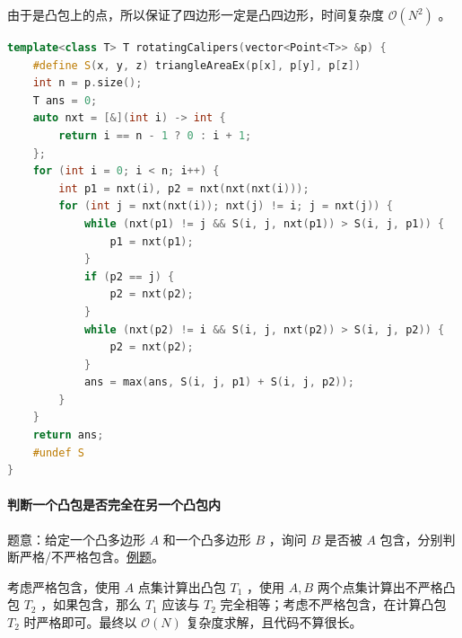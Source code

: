 由于是凸包上的点，所以保证了四边形一定是凸四边形，时间复杂度 \(\mathcal O(N^2)\) 。

\begin{lstlisting}[language={C++}]
template<class T> T rotatingCalipers(vector<Point<T>> &p) {
    #define S(x, y, z) triangleAreaEx(p[x], p[y], p[z])
    int n = p.size();
    T ans = 0;
    auto nxt = [&](int i) -> int {
        return i == n - 1 ? 0 : i + 1;
    };
    for (int i = 0; i < n; i++) {
        int p1 = nxt(i), p2 = nxt(nxt(nxt(i)));
        for (int j = nxt(nxt(i)); nxt(j) != i; j = nxt(j)) {
            while (nxt(p1) != j && S(i, j, nxt(p1)) > S(i, j, p1)) {
                p1 = nxt(p1);
            }
            if (p2 == j) {
                p2 = nxt(p2);
            }
            while (nxt(p2) != i && S(i, j, nxt(p2)) > S(i, j, p2)) {
                p2 = nxt(p2);
            }
            ans = max(ans, S(i, j, p1) + S(i, j, p2));
        }
    }
    return ans;
    #undef S
}
\end{lstlisting}

\hypertarget{ux5224ux65adux4e00ux4e2aux51f8ux5305ux662fux5426ux5b8cux5168ux5728ux53e6ux4e00ux4e2aux51f8ux5305ux5185}{%
\paragraph{判断一个凸包是否完全在另一个凸包内}\label{ux5224ux65adux4e00ux4e2aux51f8ux5305ux662fux5426ux5b8cux5168ux5728ux53e6ux4e00ux4e2aux51f8ux5305ux5185}}

题意：给定一个凸多边形 \(A\) 和一个凸多边形 \(B\) ，询问 \(B\) 是否被 \(A\) 包含，分别判断严格/不严格包含。\href{https://codeforces.com/contest/166/problem/B}{例题}。

考虑严格包含，使用 \(A\) 点集计算出凸包 \(T_1\) ，使用 \(A,B\) 两个点集计算出不严格凸包 \(T_2\) ，如果包含，那么 \(T_1\) 应该与 \(T_2\) 完全相等；考虑不严格包含，在计算凸包 \(T_2\) 时严格即可。最终以 \(\mathcal O(N)\) 复杂度求解，且代码不算很长。
